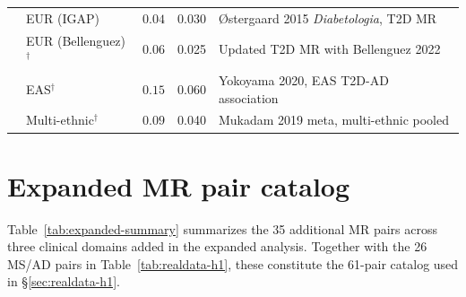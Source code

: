 \documentclass[11pt]{article}
\begin{document}
\begin{table}[h]
\begin{tabular}{@{}llccp{4.5cm}@{}}
\midrule
{}
& EUR (IGAP) & $0.04$ & 0.030 & {\O}stergaard 2015 \emph{Diabetologia}, T2D MR \\
& EUR (Bellenguez)$^\dagger$ & $0.06$ & 0.025 & Updated T2D MR with Bellenguez 2022 \\
& EAS$^\dagger$ & $0.15$ & 0.060 & Yokoyama 2020, EAS T2D-AD association \\
& Multi-ethnic$^\dagger$ & $0.09$ & 0.040 & Mukadam 2019 meta, multi-ethnic pooled \\
\bottomrule
\end{tabular}
\end{table}

\section{Expanded MR pair catalog}
\label{app:expanded-mr}

Table~\ref{tab:expanded-summary} summarizes the 35 additional MR pairs across three clinical domains added in the expanded analysis. Together with the 26 MS/AD pairs in Table~\ref{tab:realdata-h1}, these constitute the 61-pair catalog used in \S\ref{sec:realdata-h1}.
\end{document}
